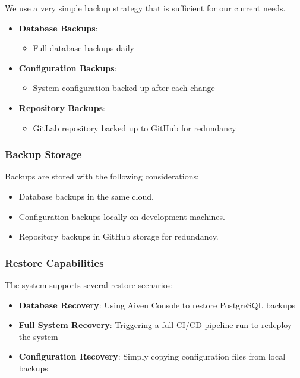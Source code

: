 We use a very simple backup strategy that is sufficient for our current needs.

\begin{itemize}
    \item \textbf{Database Backups}:
          \begin{itemize}
              \item Full database backups daily
          \end{itemize}
    \item \textbf{Configuration Backups}:
          \begin{itemize}
              \item System configuration backed up after each change
          \end{itemize}
    \item \textbf{Repository Backups}:
          \begin{itemize}
              \item GitLab repository backed up to GitHub for redundancy
          \end{itemize}
\end{itemize}

\subsubsection{Backup Storage}

Backups are stored with the following considerations:

\begin{itemize}
    \item Database backups in the same cloud.
    \item Configuration backups locally on development machines.
    \item Repository backups in GitHub storage for redundancy.
\end{itemize}

\subsubsection{Restore Capabilities}

The system supports several restore scenarios:

\begin{itemize}
    \item \textbf{Database Recovery}: Using Aiven Console to restore PostgreSQL backups
    \item \textbf{Full System Recovery}: Triggering a full CI/CD pipeline run to redeploy the system
    \item \textbf{Configuration Recovery}: Simply copying configuration files from local backups
\end{itemize}

